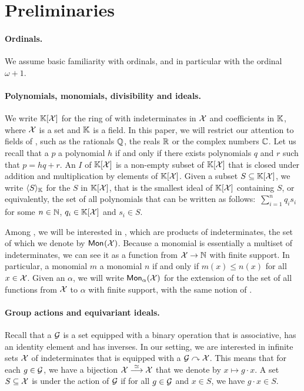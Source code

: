 \section{Preliminaries}
\label{sec:preliminaries}

\paragraph{Ordinals.} We assume basic familiarity with ordinals, and in
particular with the ordinal $\omega+1$.  

\paragraph{Polynomials, monomials, divisibility and ideals.} We write
$\poly{\K}{\X}$ for the ring of  with indeterminates in $\X$
and coefficients in $\K$, where $\X$ is a set and $\K$ is a field. In this
paper, we will restrict our attention to fields of ,
such as the rationals $\Q$, the reals $\R$ or the complex numbers $\C$. Let us
recall that a  $p$  a polynomial $h$ if and only
if there exists polynomials $q$ and $r$ such that $p = h q + r$. An
 $I$ of $\poly{\K}{\X}$ is a non-empty subset of $\poly{\K}{\X}$
that is closed under addition and multiplication by elements of
$\poly{\K}{\X}$. Given a subset $S \subseteq \poly{\K}{\X}$, we write
$\gen{S}{\K}$ for the  $S$ in $\poly{\K}{\X}$, that
is the smallest ideal of $\poly{\K}{\X}$ containing $S$, or equivalently, the
set of all polynomials that can be written as follows: $\,\sum_{i=1}^n q_i s_i$
for some $n \in \N$, $q_i \in \poly{\K}{\X}$ and $s_i \in S$.


Among , we will be interested in , which are
products of indeterminates, the set of which we denote by $\mon{\X}$. Because a
monomial is essentially a multiset of indeterminates, we can see it as a
function from $\X \to \N$ with finite support. In particular, a monomial $m$
 a monomial $n$ if and only if $m(x) \leq n(x)$ for all $x \in \X$.
Given an  $\alpha$, we will write $\mon[\alpha]{\X}$ for the
extension of  to the set of all functions from $\X$ to $\alpha$
with finite support, with the same notion of .


\paragraph{Group actions and equivariant ideals.} Recall that a 
$\group$ is a set equipped with a binary operation that is associative, has an
identity element and has inverses. In our setting, we are interested in
infinite sets $\X$ of indeterminates that is equipped with a  $\group \curvearrowright \X$. This means that for each $g \in \group$,
we have a bijection $\X \tobij \X$ that we denote by $x \mapsto g \cdot x$. A
set $S \subseteq \X$ is  under the action of $\group$ if for
all $g \in \group$ and $x \in S$, we have $g \cdot x \in S$.

